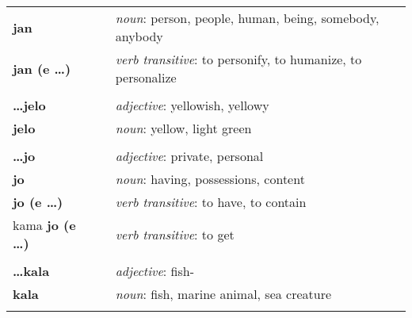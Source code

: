 \begin{supertabular}{p{2,5cm}|ll}
    \textbf{jan}                 &  & \textit{noun}: person, people, human, being, somebody, anybody                                             \\
    \textbf{jan (e \dots)}       &  & \textit{verb transitive}: to personify, to humanize, to personalize                                        \\
                                 &  &                                                                                                            \\
    \textbf{\dots jelo}          &  & \textit{adjective}: yellowish, yellowy                                                                     \\
    \textbf{jelo}                &  & \textit{noun}: yellow, light green                                                                         \\
                                 &  &                                                                                                            \\
    \textbf{\dots jo}            &  & \textit{adjective}: private, personal                                                                      \\
    \textbf{jo}                  &  & \textit{noun}: having, possessions, content                                                                \\
    \textbf{jo (e \dots)}        &  & \textit{verb transitive}: to have, to contain                                                              \\
    kama \textbf{jo (e \dots)}   &  & \textit{verb transitive}: to get                                                                           \\
                                 &  &                                                                                                            \\
    \textbf{\dots kala}          &  & \textit{adjective}: fish-                                                                                  \\
    \textbf{kala}                &  & \textit{noun}: fish, marine animal, sea creature                                                           \\
                                 &  &                                                                                                            \\

\end{supertabular}
